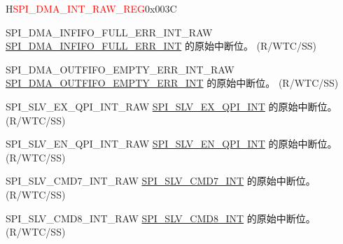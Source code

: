 \begin{register}{H}{\textcolor{red}{SPI\_DMA\_INT\_RAW\_REG}}{0x{}003C}\label{regdesc:SPIDMAINTRAWREG}
%
%
%
%
%
%
%
%
%
%
%
%
%
%
%
%
%
%
%
%
%
%
\regnewline%
\begin{regdesc}\begin{reglist}
\label{fielddesc:SPIDMAINFIFOFULLERRINTRAW}\item [SPI\_DMA\_INFIFO\_FULL\_ERR\_INT\_RAW] \hyperref[int:SPIINFIFOFULLERRINT]{SPI\_DMA\_INFIFO\_FULL\_ERR\_INT} 的原始中断位。 (R/WTC/SS)
\label{fielddesc:SPIDMAOUTFIFOEMPTYERRINTRAW}\item [SPI\_DMA\_OUTFIFO\_EMPTY\_ERR\_INT\_RAW] \hyperref[int:SPIOUTFIFOEMPTYERRINT]{SPI\_DMA\_OUTFIFO\_EMPTY\_ERR\_INT} 的原始中断位。 (R/WTC/SS)
\label{fielddesc:SPISLVEXQPIINTRAW}\item [SPI\_SLV\_EX\_QPI\_INT\_RAW] \hyperref[int:SPISLVEXQPIINT]{SPI\_SLV\_EX\_QPI\_INT} 的原始中断位。 (R/WTC/SS)
\label{fielddesc:SPISLVENQPIINTRAW}\item [SPI\_SLV\_EN\_QPI\_INT\_RAW] \hyperref[int:SPISLVENQPIINT]{SPI\_SLV\_EN\_QPI\_INT} 的原始中断位。 (R/WTC/SS)
\label{fielddesc:SPISLVCMD7INTRAW}\item [SPI\_SLV\_CMD7\_INT\_RAW] \hyperref[int:SPISLVCMD7INT]{SPI\_SLV\_CMD7\_INT} 的原始中断位。 (R/WTC/SS)
\label{fielddesc:SPISLVCMD8INTRAW}\item [SPI\_SLV\_CMD8\_INT\_RAW] \hyperref[int:SPISLVCMD8INT]{SPI\_SLV\_CMD8\_INT} 的原始中断位。 (R/WTC/SS)

\end{reglist}
\end{regdesc}
\end{register}
